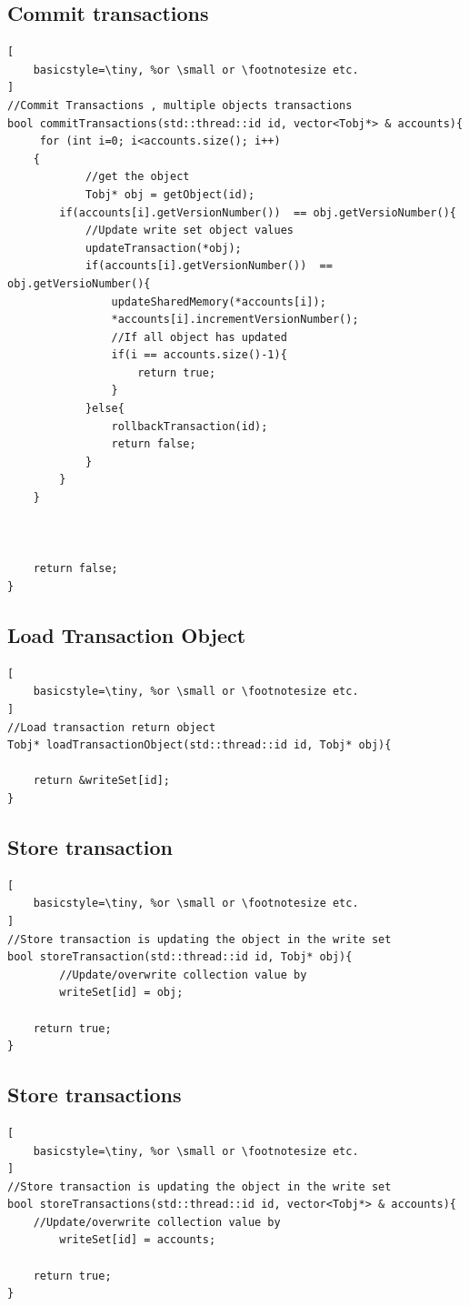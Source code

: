 \documentclass[12pt]{article}
\begin{document}
\subsection{Commit transactions}
\begin{lstlisting}[
    basicstyle=\tiny, %or \small or \footnotesize etc.
]
//Commit Transactions , multiple objects transactions
bool commitTransactions(std::thread::id id, vector<Tobj*> & accounts){
	 for (int i=0; i<accounts.size(); i++)
    {
    		//get the object
    		Tobj* obj = getObject(id);
        if(accounts[i].getVersionNumber())  == obj.getVersioNumber(){
        	//Update write set object values
			updateTransaction(*obj);
			if(accounts[i].getVersionNumber())  == obj.getVersioNumber(){
				updateSharedMemory(*accounts[i]);
				*accounts[i].incrementVersionNumber();
				//If all object has updated
				if(i == accounts.size()-1){
					return true;
				}
			}else{
				rollbackTransaction(id);
				return false;
			}
    	}
    }	

		

	return false;
}

\end{lstlisting}



\subsection{Load Transaction Object}
\begin{lstlisting}[
    basicstyle=\tiny, %or \small or \footnotesize etc.
]
//Load transaction return object
Tobj* loadTransactionObject(std::thread::id id, Tobj* obj){

	return &writeSet[id];
}
\end{lstlisting}

\subsection{Store transaction}
\begin{lstlisting}[
    basicstyle=\tiny, %or \small or \footnotesize etc.
]
//Store transaction is updating the object in the write set 
bool storeTransaction(std::thread::id id, Tobj* obj){
		//Update/overwrite collection value by  
		writeSet[id] = obj;
	
	return true;
}
\end{lstlisting}

\subsection{Store transactions}
\begin{lstlisting}[
    basicstyle=\tiny, %or \small or \footnotesize etc.
]
//Store transaction is updating the object in the write set 
bool storeTransactions(std::thread::id id, vector<Tobj*> & accounts){
	//Update/overwrite collection value by  
        writeSet[id] = accounts;

	return true;
}
\end{lstlisting}
\end{document}
